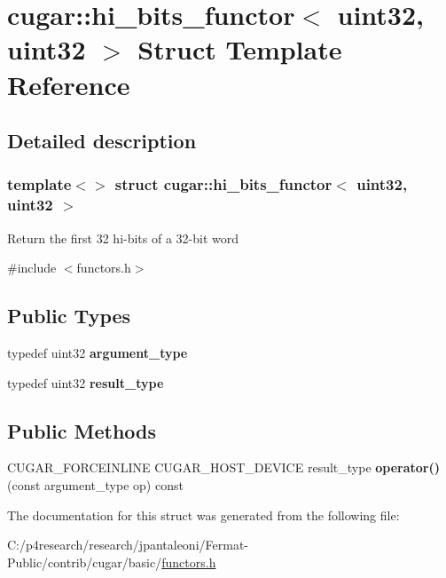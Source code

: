 \hypertarget{structcugar_1_1hi__bits__functor_3_01uint32_00_01uint32_01_4}{}\section{cugar\+:\+:hi\+\_\+bits\+\_\+functor$<$ uint32, uint32 $>$ Struct Template Reference}
\label{structcugar_1_1hi__bits__functor_3_01uint32_00_01uint32_01_4}


\subsection{Detailed description}
\subsubsection*{template$<$$>$\newline
struct cugar\+::hi\+\_\+bits\+\_\+functor$<$ uint32, uint32 $>$}

Return the first 32 hi-\/bits of a 32-\/bit word 

{\ttfamily \#include $<$functors.\+h$>$}

\subsection*{Public Types}
\begin{DoxyCompactItemize}
\item 
\mbox{\label{structcugar_1_1hi__bits__functor_3_01uint32_00_01uint32_01_4_a9f5258820949d1e3d21f7e125e124d28}} 
typedef uint32 {\bfseries argument\+\_\+type}
\item 
\mbox{\label{structcugar_1_1hi__bits__functor_3_01uint32_00_01uint32_01_4_a3a678366bdc5bc6248fc3f7249c39cab}} 
typedef uint32 {\bfseries result\+\_\+type}
\end{DoxyCompactItemize}
\subsection*{Public Methods}
\begin{DoxyCompactItemize}
\item 
\mbox{\label{structcugar_1_1hi__bits__functor_3_01uint32_00_01uint32_01_4_ae7f91c978a11be0285a05a903a3a4611}} 
C\+U\+G\+A\+R\+\_\+\+F\+O\+R\+C\+E\+I\+N\+L\+I\+NE C\+U\+G\+A\+R\+\_\+\+H\+O\+S\+T\+\_\+\+D\+E\+V\+I\+CE result\+\_\+type {\bfseries operator()} (const argument\+\_\+type op) const
\end{DoxyCompactItemize}


The documentation for this struct was generated from the following file\+:\begin{DoxyCompactItemize}
\item 
C\+:/p4research/research/jpantaleoni/\+Fermat-\/\+Public/contrib/cugar/basic/\hyperlink{functors_8h}{functors.\+h}\end{DoxyCompactItemize}
